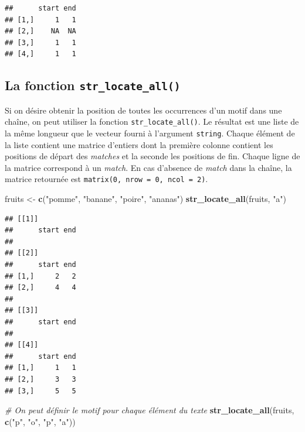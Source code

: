 \documentclass[
  11pt,
]{book}
\newenvironment{Shaded}{\begin{snugshade}}{\end{snugshade}}
\newcommand{\CommentTok}[1]{\textcolor[rgb]{0.56,0.35,0.01}{\textit{#1}}}
\newcommand{\KeywordTok}[1]{\textcolor[rgb]{0.13,0.29,0.53}{\textbf{#1}}}
\newcommand{\NormalTok}[1]{#1}
\newcommand{\StringTok}[1]{\textcolor[rgb]{0.31,0.60,0.02}{#1}}
\numberwithin{equation}{section}
\numberwithin{countremarque}{section}
\begin{document}
\begin{lstlisting}
##      start end
## [1,]     1   1
## [2,]    NA  NA
## [3,]     1   1
## [4,]     1   1
\end{lstlisting}

\hypertarget{manip_regex_stringr_locate_all}{%
\subsection{\texorpdfstring{La fonction \texttt{str\_locate\_all()}}{La fonction str\_locate\_all()}}\label{manip_regex_stringr_locate_all}}

Si on désire obtenir la position de toutes les occurrences d'un motif dans une chaîne, on peut utiliser la fonction \texttt{str\_locate\_all()}. Le résultat est une liste de la même longueur que le vecteur fourni à l'argument \texttt{string}. Chaque élément de la liste contient une matrice d'entiers dont la première colonne contient les positions de départ des \emph{matches} et la seconde les positions de fin. Chaque ligne de la matrice correspond à un \emph{match}. En cas d'absence de \emph{match} dans la chaîne, la matrice retournée est \texttt{matrix(0,\ nrow\ =\ 0,\ ncol\ =\ 2)}.

\begin{Shaded}
\begin{Highlighting}[]
\NormalTok{fruits \textless{}{-}}\StringTok{ }\KeywordTok{c}\NormalTok{(}\StringTok{"pomme"}\NormalTok{, }\StringTok{"banane"}\NormalTok{, }\StringTok{"poire"}\NormalTok{, }\StringTok{"ananas"}\NormalTok{)}
\KeywordTok{str\_locate\_all}\NormalTok{(fruits, }\StringTok{"a"}\NormalTok{)}
\end{Highlighting}
\end{Shaded}

\begin{lstlisting}
## [[1]]
##      start end
## 
## [[2]]
##      start end
## [1,]     2   2
## [2,]     4   4
## 
## [[3]]
##      start end
## 
## [[4]]
##      start end
## [1,]     1   1
## [2,]     3   3
## [3,]     5   5
\end{lstlisting}

\begin{Shaded}
\begin{Highlighting}[]
\CommentTok{\# On peut définir le motif pour chaque élément du texte}
\KeywordTok{str\_locate\_all}\NormalTok{(fruits, }\KeywordTok{c}\NormalTok{(}\StringTok{"p"}\NormalTok{, }\StringTok{"o"}\NormalTok{, }\StringTok{"p"}\NormalTok{, }\StringTok{"a"}\NormalTok{))}
\end{Highlighting}
\end{Shaded}
\end{document}

